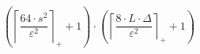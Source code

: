 \[\left(\left\lceil \frac{64 \cdot s^{2}}{\varepsilon^{2}} \right\rceil_{+} + 1\right) \cdot \left(\left\lceil \frac{8 \cdot L \cdot \Delta}{\varepsilon^{2}} \right\rceil_{+} + 1\right)\]
